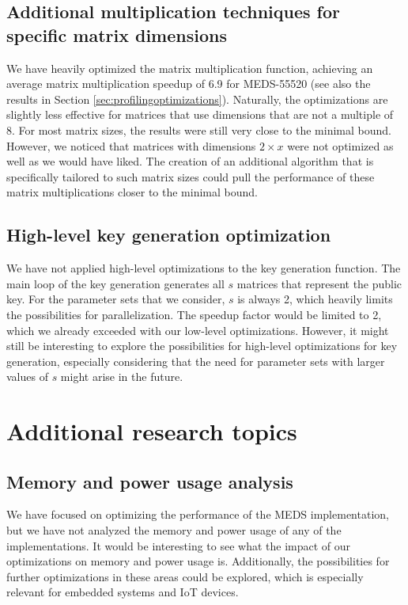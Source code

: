 \documentclass[11pt,a4paper]{report}
\theoremstyle{definition}
\begin{document}
\subsection*{Additional multiplication techniques for specific matrix dimensions}
We have heavily optimized the matrix multiplication function, achieving an average matrix multiplication speedup of 6.9 for MEDS-55520 (see also the results in Section \ref{sec:profilingoptimizations}). Naturally, the optimizations are slightly less effective for matrices that use dimensions that are not a multiple of 8. For most matrix sizes, the results were still very close to the minimal bound. However, we noticed that matrices with dimensions $2 \times x$ were not optimized as well as we would have liked. The creation of an additional algorithm that is specifically tailored to such matrix sizes could pull the performance of these matrix multiplications closer to the minimal bound.

\subsection*{High-level key generation optimization}
We have not applied high-level optimizations to the key generation function. The main loop of the key generation generates all $s$ matrices that represent the public key. For the parameter sets that we consider, $s$ is always 2, which heavily limits the possibilities for parallelization. The speedup factor would be limited to 2, which we already exceeded with our low-level optimizations. However, it might still be interesting to explore the possibilities for high-level optimizations for key generation, especially considering that the need for parameter sets with larger values of $s$ might arise in the future.

\section{Additional research topics}

\subsection*{Memory and power usage analysis}
We have focused on optimizing the performance of the MEDS implementation, but we have not analyzed the memory and power usage of any of the implementations. It would be interesting to see what the impact of our optimizations on memory and power usage is. Additionally, the possibilities for further optimizations in these areas could be explored, which is especially relevant for embedded systems and IoT devices.
\end{document}

